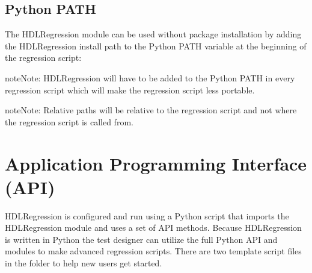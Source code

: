 \documentclass[letterpaper,10pt,english]{sphinxmanual}
\begin{document}
\section{Python PATH}
\label{\detokenize{intro:python-path}}
\sphinxAtStartPar
The HDLRegression module can be used without package installation by adding the HDLRegression install path to the
Python PATH variable at the beginning of the regression script:

\begin{sphinxVerbatim}[commandchars=\\\{\}]
 

   
\end{sphinxVerbatim}

\begin{sphinxadmonition}{note}{Note:}
\sphinxAtStartPar
HDLRegression will have to be added to the Python PATH in every regression script which will make
the regression script less portable.
\end{sphinxadmonition}

\begin{sphinxadmonition}{note}{Note:}
\sphinxAtStartPar
Relative paths will be relative to the regression script
and not where the regression script is called from.
\end{sphinxadmonition}

\sphinxstepscope


\chapter{Application Programming Interface (API)}
\label{\detokenize{api:application-programming-interface-api}}\label{\detokenize{api::doc}}
\sphinxAtStartPar
HDLRegression is configured and run using a Python script that imports the HDLRegression module and
uses a set of API methods. Because HDLRegression is written in Python the test designer can
utilize the full Python API and modules to make advanced regression scripts.
There are two template script files in the  folder to help new users get started.
\end{document}

